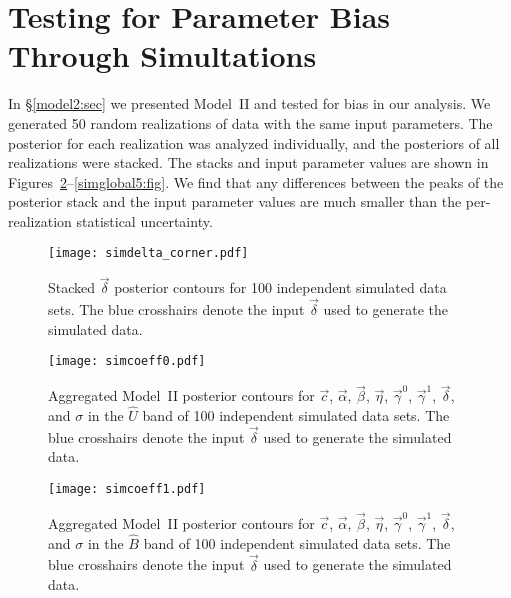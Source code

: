 \documentclass{aastex61}   	%
\begin{document}
\appendix
\section{Testing for Parameter Bias Through Simultations}
In \S\ref{model2:sec} we presented Model~II and tested for bias in our analysis.
We generated 50 random realizations of data with the same input  parameters.
The posterior for each realization was analyzed individually, and the posteriors of all realizations were stacked.
The stacks and input parameter values are shown in Figures~\ref{simglobal1:fig}--\ref{simglobal5:fig}.
We find that any differences between the peaks of the posterior stack and the input parameter values
are much smaller than the per-realization statistical uncertainty.

\begin{figure}[htbp] %
   \centering
   \texttt{[image: simdelta\_corner.pdf]} 
            \caption{Stacked $\vec{\delta}$ posterior contours for \color{red} 100 \color{black} independent simulated data sets.
            The blue crosshairs denote the input $\vec{\delta}$ used to generate the simulated data.
            \label{simdelta:fig}}
\end{figure}

\begin{figure}[htbp] %
   \centering
   \texttt{[image: simcoeff0.pdf]} 
            \caption{Aggregated Model~II posterior contours for $\vec{c}$, $\vec{\alpha}$, $\vec{\beta}$, $\vec{\eta}$, $\vec{\gamma}^0$, $\vec{\gamma}^1$,  $\vec{\delta}$, and $\sigma$ in the ${\hat{U}}$ band of \color{red} 100 \color{black} independent simulated data sets.  The blue crosshairs denote the input $\vec{\delta}$ used to generate the simulated data.
            \label{simglobal1:fig}}
\end{figure}

\begin{figure}[htbp] %
   \centering
   \texttt{[image: simcoeff1.pdf]} 
            \caption{Aggregated Model~II posterior contours for $\vec{c}$, $\vec{\alpha}$, $\vec{\beta}$, $\vec{\eta}$, $\vec{\gamma}^0$, $\vec{\gamma}^1$,  $\vec{\delta}$, and $\sigma$ in the ${\hat{B}}$ band of \color{red} 100 \color{black} independent simulated data sets.  The blue crosshairs denote the input $\vec{\delta}$ used to generate the simulated data.
 \label{simglobal2:fig}}
\end{figure}
\end{document}
